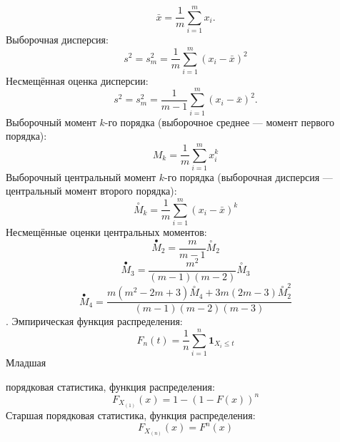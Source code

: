 \documentclass[a4paper, 10pt]{article}
\theoremstyle{definition}
\theoremstyle{remark}
\begin{document}
\[\bar x = \frac1m \sum_{i=1}^m x_i.\]
Выборочная дисперсия:
\[s^2 = s_m^2 = \frac1m \sum_{i=1}^m \left( x_i - \bar x \right)^2\]
Несмещённая оценка дисперсии:
\[s^2 = s_m^2 = \frac1{m-1} \sum_{i=1}^m \left( x_i - \bar x \right)^2.\]
Выборочный момент $k$-го порядка (выборочное среднее — момент первого порядка):
\[M_k = \frac1m \sum_{i=1}^m x^k_i\]
Выборочный центральный момент $k$-го порядка (выборочная дисперсия — центральный момент второго порядка):
\[\overset{\circ}M_k = \frac1m \sum_{i=1}^m \left( x_i - \bar x \right)^k\]
Несмещённые оценки центральных моментов:
\[\overset{\bullet}M_2 = \frac{m}{m-1} \overset{\circ}M_2\]
\[\overset{\bullet}M_3 = \frac{m^2}{(m-1)(m-2)} \overset{\circ}M_3\]
\[\overset{\bullet}M_4 = \frac{m(m^2-2m+3)\overset{\circ}M_4 + 3m(2m-3)\overset{\circ}M_2^2}{(m-1)(m-2)(m-3)}\].
Эмпирическая функция распределения:
\[F_n(t) = \frac{1}{n} \sum_{i=1}^n \mathbf{1}_{X_i \le t}\]
Младшая

 порядковая статистика, функция распределения:
\[F_{X_{(1)}}(x) = 1 - {(1 - F(x))}^n\]
Старшая порядковая статистика, функция распределения:
\[F_{X_{(n)}}(x) = F^n(x)\]
\end{document}
